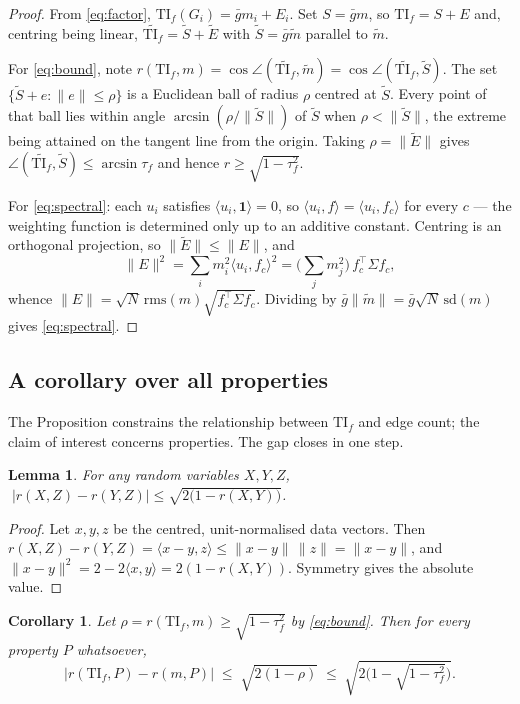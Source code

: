 \documentclass[11pt,a4paper]{article}
\theoremstyle{plain}
\newtheorem{lemma}{Lemma}
\newtheorem{corollary}{Corollary}
\newcommand{\TI}{\mathrm{TI}}
\newcommand{\rms}{\mathrm{rms}}
\newcommand{\sd}{\mathrm{sd}}
\begin{document}
\begin{proof}
From \eqref{eq:factor}, $\TI_f(G_i)=\bar g m_i+E_i$. Set $S=\bar g m$, so
$\TI_f=S+E$ and, centring being linear, $\widetilde{\TI_f}=\tilde S+\tilde E$ with
$\tilde S=\bar g\tilde m$ parallel to $\tilde m$.

For \eqref{eq:bound}, note $r(\TI_f,m)=\cos\angle(\widetilde{\TI_f},\tilde m)
=\cos\angle(\widetilde{\TI_f},\tilde S)$. The set $\{\tilde S+e:\|e\|\le\rho\}$ is a
Euclidean ball of radius $\rho$ centred at $\tilde S$. Every point of that ball lies within
angle $\arcsin(\rho/\|\tilde S\|)$ of $\tilde S$ when $\rho<\|\tilde S\|$, the extreme
being attained on the tangent line from the origin. Taking $\rho=\|\tilde E\|$ gives
$\angle(\widetilde{\TI_f},\tilde S)\le\arcsin\tau_f$ and hence
$r\ge\sqrt{1-\tau_f^2}$.

For \eqref{eq:spectral}: each $u_i$ satisfies $\langle u_i,\mathbf{1}\rangle=0$, so
$\langle u_i,f\rangle=\langle u_i,f_c\rangle$ for every $c$ --- the weighting function is
determined only up to an additive constant. Centring is an orthogonal projection, so
$\|\tilde E\|\le\|E\|$, and
\[
\|E\|^2=\sum_i m_i^2\langle u_i,f_c\rangle^2
=\Big(\sum_j m_j^2\Big)\,f_c^{\!\top}\Sigma f_c ,
\]
whence $\|E\|=\sqrt{N}\,\rms(m)\sqrt{f_c^{\!\top}\Sigma f_c}$. Dividing by
$\bar g\|\tilde m\|=\bar g\sqrt{N}\,\sd(m)$ gives \eqref{eq:spectral}.
\end{proof}

\subsection{A corollary over all properties}

The Proposition constrains the relationship between $\TI_f$ and edge count; the claim of
interest concerns properties. The gap closes in one step.

\begin{lemma}
For any random variables $X,Y,Z$,
$\;|r(X,Z)-r(Y,Z)|\le\sqrt{2\bigl(1-r(X,Y)\bigr)}$.
\end{lemma}

\begin{proof}
Let $x,y,z$ be the centred, unit-normalised data vectors. Then
$r(X,Z)-r(Y,Z)=\langle x-y,z\rangle\le\|x-y\|\,\|z\|=\|x-y\|$, and
$\|x-y\|^2=2-2\langle x,y\rangle=2(1-r(X,Y))$. Symmetry gives the absolute value.
\end{proof}

\begin{corollary}
Let $\rho=r(\TI_f,m)\ge\sqrt{1-\tau_f^2}$ by \eqref{eq:bound}. Then for \emph{every}
property $P$ whatsoever,
\begin{equation}
\bigl|r(\TI_f,P)-r(m,P)\bigr|\;\le\;\sqrt{2(1-\rho)}\;\le\;
\sqrt{2\bigl(1-\sqrt{1-\tau_f^2}\bigr)} .
\label{eq:corollary}
\end{equation}
\end{corollary}
\end{document}
